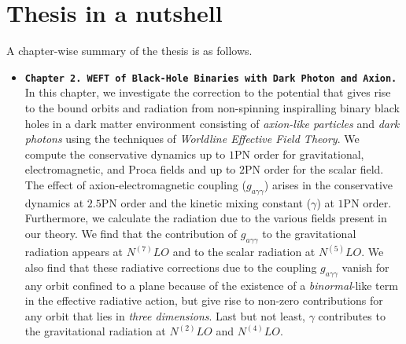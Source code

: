 \section{Thesis in a nutshell}
\noindent A chapter-wise summary of the thesis is as follows.
\begin{itemize}[leftmargin=1.75em,topsep=0pt,itemsep=0.18em,parsep=0pt,partopsep=0pt]

  \item \textbf{\texttt{Chapter 2. WEFT of Black-Hole Binaries with Dark Photon and Axion.}} In this chapter, we investigate the correction to the potential that gives rise to the bound orbits and radiation from non-spinning inspiralling binary black holes in a dark matter environment consisting of \textit{axion-like particles} and \textit{dark photons} using the techniques of \textit{Worldline Effective Field Theory}. We compute the conservative dynamics up to $1$PN order for gravitational, electromagnetic, and Proca fields and up to $2$PN order for the scalar field. The effect of axion-electromagnetic coupling ($g_{a\gamma\gamma}$) arises in the conservative dynamics at $2.5$PN order and the kinetic mixing constant ($\gamma$) at $1$PN order. Furthermore, we calculate the radiation due to the various fields present in our theory. We find that the contribution of $g_{a\gamma\gamma}$ to the gravitational radiation appears at $N^{(7)}LO$ and to the scalar radiation at $N^{(5)}LO$. We also find that these radiative corrections due to the coupling $g_{a\gamma\gamma}$ vanish for any orbit confined to a plane because of the existence of a \textit{binormal}-like term in the effective radiative action, but give rise to non-zero contributions for any orbit that lies in \textit{three dimensions}. Last but not least, $\gamma$ contributes to the gravitational radiation at $N^{(2)}LO$ and $N^{(4)}LO$.


\end{itemize}

